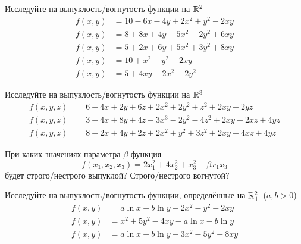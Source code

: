
\begin{exercise}
Исследуйте на выпуклость/вогнутость функции на \({\mathbb R}^2\)
\begin{align*}
	f(x,y) &= 10-6x-4y+2x^2+y^2-2xy \\
	f(x,y) &= 8+8x+4y-5x^2-2y^2+6xy \\
	f(x,y) &= 5+2x+6y+5x^2+3y^2+8xy \\
	f(x,y) &= 10+x^2+y^2+2xy \\
	f(x,y) &= 5+4xy-2x^2-2y^2
\end{align*}
\end{exercise}

\begin{exercise}
Исследуйте на выпуклость/вогнутость функции на \({\mathbb R}^3\)
\begin{align*}
	f(x,y,z) &= 6+4x+2y+6z+2x^2+2y^2+z^2+2xy+2yz \\
	f(x,y,z) &= 3+4x+8y+4z-3x^3-2y^2-4z^2+2xy+2xz+4yz\\
	f(x,y,z) &= 8+2x+4y+2z+2x^2+y^2+3z^2+2xy+4xz+4yz
\end{align*}
\end{exercise}

\begin{exercise}
При каких значениях параметра $\beta$ функция
\[
	f(x_1,x_2,x_3)=2x_1^2+4x_2^2+x_3^2-\beta x_1x_3
\]
будет строго/нестрого выпуклой? Строго/нестрого вогнутой?
\end{exercise}

\begin{exercise}
Исследуйте на выпуклость/вогнутость функции, определённые на 
\({\mathbb R}^2_+\) (\(a,b>0\))
\begin{align*}
	f(x,y) &= a\ln x+b\ln y-2x^2-y^2-2xy \\
	f(x,y) &= x^2+5y^2-4xy-a\ln x-b\ln y \\
	f(x,y) &= a\ln x+b\ln y -3x^2-5y^2-8xy
\end{align*}
\end{exercise}